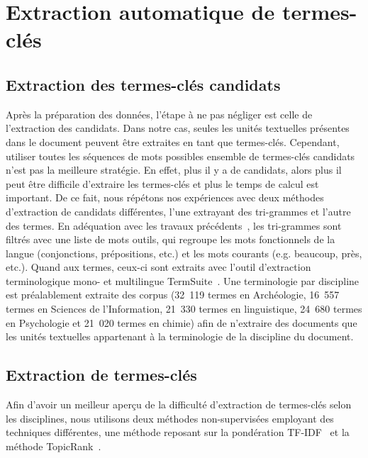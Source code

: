 \section{Extraction automatique de termes-clés}
\label{sec:extraction_automatique_de_termes_cles}
  \subsection{Extraction des termes-clés candidats}
  \label{subsec:extraction_de_termes_cles_candidats}
    Après la préparation des données, l'étape à ne pas négliger est celle
    de l'extraction des candidats. Dans notre cas, seules les unités textuelles
    présentes dans le document peuvent être extraites en tant que termes-clés.
    Cependant, utiliser toutes les séquences de mots possibles ensemble de
    termes-clés candidats n'est pas la meilleure stratégie. En effet, plus il y
    a de candidats, alors plus il peut être difficile d'extraire les termes-clés
    et plus le temps de calcul est important. De ce fait, nous répétons nos
    expériences avec deux méthodes d'extraction de candidats différentes, l'une
    extrayant des tri-grammes et l'autre des termes. En adéquation avec les
    travaux précédents~\cite{witten1999kea}, les tri-grammes sont filtrés avec
    une liste de mots outils, qui regroupe les mots fonctionnels de la langue
    (conjonctions, prépositions, etc.) et les mots courants (e.g.
    \og{}beaucoup\fg{}, \og{}près\fg{}, etc.). Quand aux termes, ceux-ci sont
    extraits avec l'outil d'extraction terminologique mono- et multilingue
    TermSuite~\cite{rocheteau2011termsuite}. Une terminologie par discipline est
    préalablement extraite des corpus (32~119 termes en Archéologie, 16~557
    termes en Sciences de l'Information, 21~330 termes en linguistique, 24~680
    termes en Psychologie et 21~020 termes en chimie) afin de n'extraire des
    documents que les unités textuelles appartenant à la terminologie de la
    discipline du document.

  \subsection{Extraction de termes-clés}
  \label{subsec:extraction_de_termes_cles}
    Afin d'avoir un meilleur aperçu de la difficulté d'extraction de termes-clés
    selon les disciplines, nous utilisons deux méthodes non-supervisées
    employant des techniques différentes, une méthode reposant sur la
    pondération TF-IDF~\cite{jones1972tfidf} et la méthode
    TopicRank~\cite{bougouin2013topicrank}.

